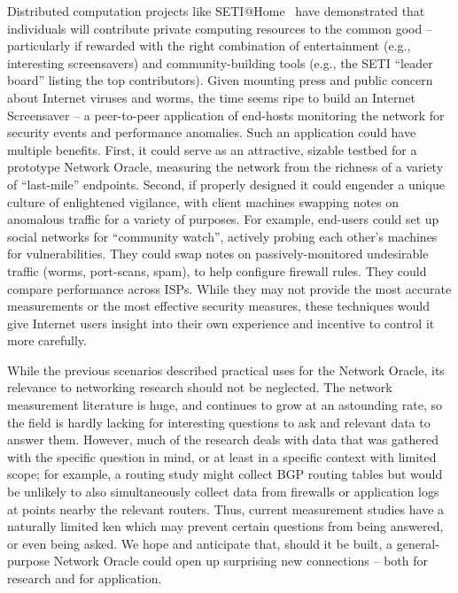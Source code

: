 \documentclass[twocolumn,10pt]{article}
\newcommand{\note}[1]{}
\def\Sys{Network Oracle\xspace}
\begin{document}
\vspace{1em} 
\note{Hellerstein} Distributed
computation projects like SETI@Home~\cite{anderson_cacm_2002} have
demonstrated that individuals will contribute private computing
resources to the common good
 -- particularly if rewarded with the right combination of
entertainment (e.g., interesting screensavers) and community-building
tools (e.g., 
the SETI ``leader board'' listing the top contributors).  
Given mounting
press and public concern about Internet viruses and worms, the time
seems ripe to build an Internet Screensaver -- a peer-to-peer
application of end-hosts monitoring the network for security events
and performance anomalies.  Such an application could have multiple
benefits.  First, it could serve as an attractive, sizable testbed
for a prototype \Sys, measuring the network from the richness of a
variety of ``last-mile'' endpoints.  Second, if properly designed it
could engender a unique culture of enlightened vigilance, with
client machines swapping notes on anomalous traffic for a variety of
purposes.  For example, end-users could set up social networks for
``community watch'', actively probing each other's machines for
vulnerabilities.  They could swap notes on passively-monitored
undesirable traffic (worms, port-scans, spam), to help configure
firewall rules.  They could compare performance across ISPs.  While
they may not provide the most accurate measurements or the most effective
security measures, these techniques would give Internet 
users insight into their own experience and
incentive to control it more carefully.  

\vspace{1em}
\note{Shenker}
While the previous scenarios described practical uses for the
\Sys, its relevance to networking research should not be neglected.
The network measurement literature is huge, and continues to grow at
an astounding rate, so the field is hardly lacking for interesting
questions to ask and relevant data to answer them.  However, much of
the research deals with data that was gathered with the specific
question in mind, or at least in a specific context with limited
scope; for example, a routing study might collect BGP routing tables
but would be unlikely to also simultaneously collect data from
firewalls or application logs at points nearby the relevant routers.
Thus, current measurement studies have a naturally limited ken which
may prevent certain questions from being answered, or even being
asked.  We hope and anticipate that, should it be built, a
general-purpose \Sys could open up surprising new connections -- both
for research and for application.
\end{document}
